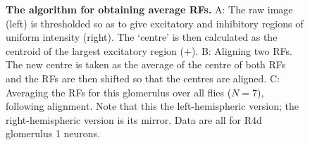 \documentclass[10pt]{article}
\begin{document}
\begin{comment}
Neural networks were trained to estimate the elevation and azimuth of randomly generated `blob' stimuli ($N=10,000$) from raw views ($N=36$~pixels; blue), R2 neurons ($N=28$; red), R4d neurons ($N=14$; green) or R2 and R4 neurons ($N=42$; magenta). For each visual input a network was trained 100 times and average performance with blobs that were not part of the training set was taken.
A and B: Plots of elevation and azimuth of the test visual stimuli \emph{vs} the mean network output ($N=100$). The dashed line indicates ideal performance (i.e. $y=x$) and the thickness of the lines at each point shows standard error.
The possible values of elevation and azimuth were constrained by the size of the fruitfly visual field (approx. $120\degree \times 270\degree$). Within this range there were 22 possible values.
C and D: Average network performance (mean square error) for networks trained to recover elevation (C) or azimuth (D) and for each type of visual input (colour code as above). Standard error is shown, but is very small.
Neural networks were trained to estimate the orientation and size of randomly generated 'blob' stimuli ($N=1000$) from different visual encodings (details same as for Figure~\ref{fig:elaz}).
A and B: Network performance in recovering stimulus orientation and size. Orientation was constrained between 0\degree\ and 90\degree, to avoid the problem of aliasing, and varied with 22 levels (conventions as in Figure~\ref{fig:elaz}).
C and D: Average network performance (mean square error) for networks trained to recover orientation (C) or size (D) and for each type of visual input (colour code as previously). Standard error is shown, but is very small.
\end{comment}

\begin{figure}
	\caption{
		{\bf The algorithm for obtaining average RFs.}
		A: The raw image (left) is thresholded so as to give excitatory and inhibitory regions of uniform intensity (right).
		The `centre' is then calculated as the centroid of the largest excitatory region (+).
		B: Aligning two RFs.
		The new centre is taken as the average of the centre of both RFs and the RFs are then shifted so that the centres are aligned.
		C: Averaging the RFs for this glomerulus over all flies ($N=7$), following alignment.
		Note that this the left-hemispheric version; the right-hemispheric version is its mirror.
		Data are all for R4d glomerulus 1 neurons.
		}
	\label{fig:avkernels}
\end{figure}
\end{document}

